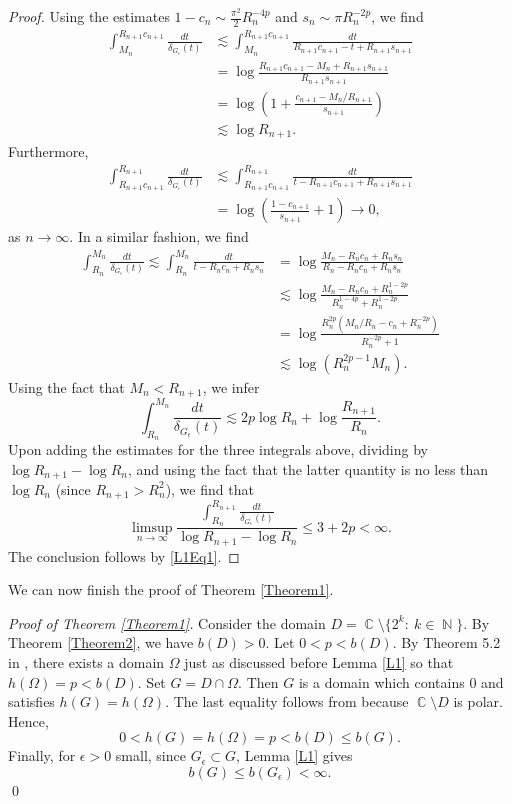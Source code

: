 \documentclass[11pt, letterpaper,leqno]{amsart}
\numberwithin{equation}{section}
\theoremstyle{definition}
\DeclareMathOperator{\N}{\mathbb{N}}
\DeclareMathOperator{\C}{\mathbb{C}}
\begin{document}
\begin{proof}
Using the estimates $1-c_n\sim \frac{\pi^2}{2} R_n^{-4p}$ and $s_n \sim \pi R_n^{-2p}$, we find
\begin{align*}
	\int_{M_n}^{R_{n+1}c_{n+1}}\frac{dt}{\delta_{G_\epsilon}(t)} &\lesssim \int_{M_n}^{R_{n+1}c_{n+1}}\frac{dt}{R_{n+1}c_{n+1}-t+R_{n+1}s_{n+1}}\\
	&=\log\frac{R_{n+1}c_{n+1}-M_n+R_{n+1}s_{n+1}}{R_{n+1}s_{n+1}} \\
	&=\log\left(1+\frac{c_{n+1}-M_n/R_{n+1}}{s_{n+1}}\right) \\
	&\lesssim \log R_{n+1}.
\end{align*}
Furthermore, 
\begin{align*}
\int_{R_{n+1}c_{n+1}}^{R_{n+1}}\frac{dt}{\delta_{G_\epsilon}(t)}&\lesssim 
\int_{R_{n+1}c_{n+1}}^{R_{n+1}}\frac{dt}{t-R_{n+1}c_{n+1}+R_{n+1}s_{n+1}}\\
&=\log\left(\frac{1-c_{n+1}}{s_{n+1}}+1\right)\to 0,
\end{align*}
as $n\to\infty$. In a similar fashion, we find
\begin{align*}
\int_{R_n}^{M_n}\frac{dt}{\delta_{G_\epsilon}(t)}\lesssim \int_{R_n}^{M_n}\frac{dt}{t-R_nc_n+R_ns_n}&=\log\frac{M_n-R_nc_n+R_ns_n}{R_n-R_nc_n+R_ns_n}\\
&\lesssim \log\frac{M_n-R_nc_n+R_n^{1-2p}}{R_n^{1-4p}+R_n^{1-2p}}\\
&=\log \frac{R_n^{2p}\left(M_n/R_n-c_n+R_n^{-2p}\right)}{R_n^{-2p}+1}\\
&\lesssim \log \left(R_n^{2p-1}M_n\right).
\end{align*}
Using the fact that $M_n<R_{n+1}$, we infer
\[
\int_{R_n}^{M_n}\frac{dt}{\delta_{G_\epsilon}(t)}\lesssim 2p\log R_n+\log\frac{R_{n+1}}{R_n}.
\]
Upon adding the estimates for the three integrals above, dividing by $\log R_{n+1}-\log R_n$, and using the fact that the latter quantity is no less than $\log R_n$ (since $R_{n+1}>R_n^2$), we find that 
\[
\limsup_{n\to\infty}\frac{\int_{R_n}^{R_{n+1}}\frac{dt}{\delta_{G_\epsilon}(t)}}{\log R_{n+1}-\log R_n}\leq 3+2p<\infty.
\]                            
The conclusion follows by \eqref{L1Eq1}.
\end{proof}

We can now finish the proof of Theorem \ref{Theorem1}.

\noindent\textit{Proof of Theorem \ref{Theorem1}.}
Consider the domain $D=\C\setminus\{2^k:\ k\in \N\}$. By Theorem \ref{Theorem2}, we have $b(D)>0$. Let $0<p<b(D)$. By Theorem 5.2 in \cite{CZKR}, there exists a domain $\Omega$ just as discussed before Lemma \ref{L1} so that $h(\Omega)=p<b(D)$. Set $G=D\cap\Omega$. Then $G$ is a domain which contains $0$ and satisfies $h(G)=h(\Omega)$. The last equality follows from \cite[Theorem 2.4(i)]{KimSug} because $\C\setminus D$ is polar. Hence,
\[
0<h(G)=h(\Omega)=p<b(D)\leq b(G).
\]
Finally, for $\epsilon>0$ small, since $G_\epsilon\subset G$, Lemma \ref{L1} gives
\[
b(G)\leq b(G_\epsilon)<\infty.
\]
\qed
\end{document}
